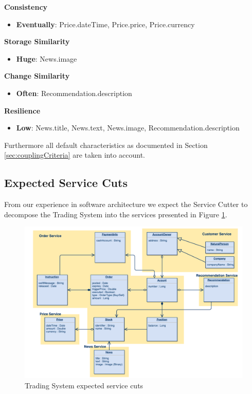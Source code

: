\textbf{Consistency}

\begin{itemize}
\item \textbf{Eventually}: Price.dateTime, Price.price, Price.currency
\end{itemize}

\textbf{Storage Similarity}

\begin{itemize}
\item \textbf{Huge}: News.image
\end{itemize}

\textbf{Change Similarity}

\begin{itemize}
\item \textbf{Often}: Recommendation.description
\end{itemize}

\textbf{Resilience}

\begin{itemize}
\item \textbf{Low}: News.title, News.text, News.image, Recommendation.description
\end{itemize}

Furthermore all default characteristics as documented in Section \ref{sec:couplingCriteria} are taken into account.

\subsection{Expected Service Cuts}

From our experience in software architecture we expect the Service Cutter to decompose the Trading System into the services presented in Figure \ref{fig:tradingCuts}.

\begin{figure}[H]
	\includegraphics[scale=0.5]{diagrams/TradingSystem-ServiceCut.pdf}
	\caption{Trading System expected service cuts}
	\label{fig:tradingCuts}
\end{figure}

